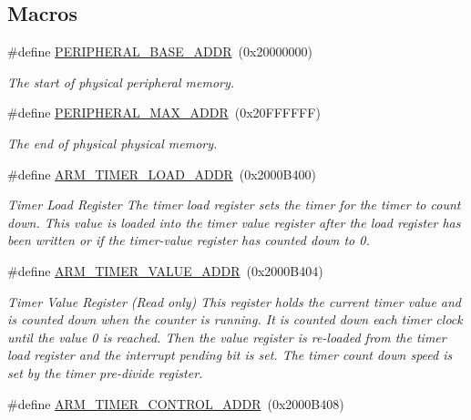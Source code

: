 \subsection*{Macros}
\begin{DoxyCompactItemize}
\item 
\#define \hyperlink{group__Peripherals_gac7a1d4c43a8ef81fe4f18a6c49541657}{P\+E\+R\+I\+P\+H\+E\+R\+A\+L\+\_\+\+B\+A\+S\+E\+\_\+\+A\+D\+DR}~(0x20000000)
\begin{DoxyCompactList}\small\item\em The start of physical peripheral memory. \end{DoxyCompactList}\item 
\#define \hyperlink{group__Peripherals_ga49adb525268a836f74bd190622fa100c}{P\+E\+R\+I\+P\+H\+E\+R\+A\+L\+\_\+\+M\+A\+X\+\_\+\+A\+D\+DR}~(0x20\+F\+F\+F\+F\+F\+F)
\begin{DoxyCompactList}\small\item\em The end of physical physical memory. \end{DoxyCompactList}\item 
\#define \hyperlink{group__Peripherals_ga2256ab9b7182daae7cf50e8433c4f49e}{A\+R\+M\+\_\+\+T\+I\+M\+E\+R\+\_\+\+L\+O\+A\+D\+\_\+\+A\+D\+DR}~(0x2000\+B400)
\begin{DoxyCompactList}\small\item\em Timer Load Register The timer load register sets the timer for the timer to count down. This value is loaded into the timer value register after the load register has been written or if the timer-\/value register has counted down to 0. \end{DoxyCompactList}\item 
\#define \hyperlink{group__Peripherals_ga65e968877416839d0a1f53f2b1fffd25}{A\+R\+M\+\_\+\+T\+I\+M\+E\+R\+\_\+\+V\+A\+L\+U\+E\+\_\+\+A\+D\+DR}~(0x2000\+B404)
\begin{DoxyCompactList}\small\item\em Timer Value Register (Read only) This register holds the current timer value and is counted down when the counter is running. It is counted down each timer clock until the value 0 is reached. Then the value register is re-\/loaded from the timer load register and the interrupt pending bit is set. The timer count down speed is set by the timer pre-\/divide register. \end{DoxyCompactList}\item 
\#define \hyperlink{group__Peripherals_gae31f9fc9d4a23333bf1b7d21c5342c6c}{A\+R\+M\+\_\+\+T\+I\+M\+E\+R\+\_\+\+C\+O\+N\+T\+R\+O\+L\+\_\+\+A\+D\+DR}~(0x2000\+B408)

\end{DoxyCompactItemize}
